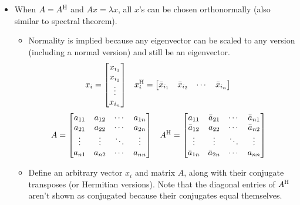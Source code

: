 \documentclass{article}
\begin{document}
\begin{itemize}
\begin{itemize}
    \end{itemize}
    \item When $A=A^{\text{H}}$ and $Ax=\lambda x$, all $x$'s can be chosen orthonormally (also similar to spectral theorem).
    \begin{itemize}
        \item Normality is implied because any eigenvector can be scaled to any version (including a normal version) and still be an eigenvector.
        \begin{align*}
            x_i &=
            \begin{bmatrix}
                x_{i_1}\\
                x_{i_2}\\
                \vdots\\
                x_{i_n}\\
            \end{bmatrix}&
                x_i^{\text{H}} &=
                \begin{bmatrix}
                    \bar{x}_{i_1} & \bar{x}_{i_2} & \cdots & \bar{x}_{i_n}\\
                \end{bmatrix}
        \end{align*}
        \begin{align*}
            A &=
            \begin{bmatrix}
                a_{11} & a_{12} & \cdots & a_{1n}\\
                a_{21} & a_{22} & \cdots & a_{2n}\\
                \vdots & \vdots & \ddots & \vdots\\
                a_{n1} & a_{n2} & \cdots & a_{nn}\\
            \end{bmatrix}&
                A^{\text{H}} &=
                \begin{bmatrix}
                    a_{11} & \bar{a}_{21} & \cdots & \bar{a}_{n1}\\
                    \bar{a}_{12} & a_{22} & \cdots & \bar{a}_{n2}\\
                    \vdots & \vdots & \ddots & \vdots\\
                    \bar{a}_{1n} & \bar{a}_{2n} & \cdots & a_{nn}\\
                \end{bmatrix}
        \end{align*}
        \item Define an arbitrary vector $x_i$ and matrix $A$, along with their conjugate transposes (or Hermitian versions). Note that the diagonal entries of $A^{\text{H}}$ aren't shown as conjugated because their conjugates equal themselves.

\end{itemize}
\end{itemize}
\end{document}
